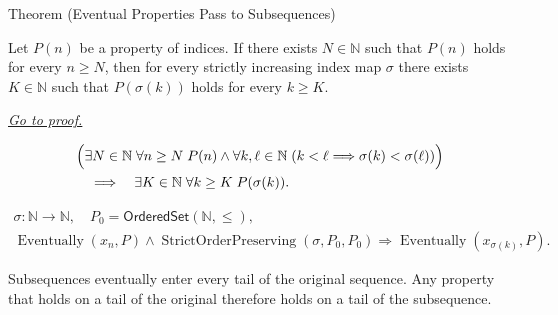 
\begin{theorembox}{Theorem (Eventual Properties Pass to Subsequences)}
\begin{theorem}
\label{thm:eventual-properties-pass-to-subsequences}
Let $P(n)$ be a property of indices. If there exists $N\in\mathbb{N}$ such
that $P(n)$ holds for every $n\ge N$, then for every strictly increasing
index map $\sigma$ there exists $K\in\mathbb{N}$ such that $P(\sigma(k))$
holds for every $k\ge K$.

\smallskip
\noindent
\hyperref[prf:eventual-properties-pass-to-subsequences]{\textit{Go to proof.}}
\end{theorem}
\end{theorembox}

\begin{remark*}
\[
\begin{aligned}
&\Bigl(
  \exists N\in\mathbb{N}\;\forall n\ge N\;P(n)
  \land
  \forall k,\ell\in\mathbb{N}\;(k<\ell\Longrightarrow\sigma(k)<\sigma(\ell))
\Bigr)\\
&\quad\Longrightarrow\quad
\exists K\in\mathbb{N}\;\forall k\ge K\;P(\sigma(k)).
\end{aligned}
\]
\end{remark*}

\begin{remark*}
\[
\begin{gathered}
\sigma\colon\mathbb{N}\to\mathbb{N},\quad
P_0=\mathsf{OrderedSet}(\mathbb{N},\leq),\\
\operatorname{Eventually}(x_n,P)
\land
\operatorname{StrictOrderPreserving}(\sigma,P_0,P_0)
\Longrightarrow
\operatorname{Eventually}(x_{\sigma(k)},P).
\end{gathered}
\]
\end{remark*}

\begin{remark*}[Interpretation]
Subsequences eventually enter every tail of the original sequence. Any
property that holds on a tail of the original therefore holds on a tail of
the subsequence.
\end{remark*}

